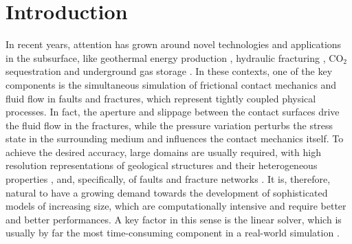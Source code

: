 \documentclass[3p,times]{elsarticle}
\theoremstyle{plain}
\begin{document}

\allowdisplaybreaks


\section{Introduction}
\label{sec:intro}

In recent years, attention has grown around novel technologies and applications in the
subsurface, like geothermal energy production \cite{pan2019establishment,
wei2019numerical, asai2019efficient}, hydraulic fracturing \cite{williams2019discursive,
tan2019politics, krzaczek2020simulations}, CO$_2$ sequestration \cite{fan2019thermo,
li2019coupled, liu2019tutorial} and underground gas storage \cite{zhou2019seismological,
karev2019geomechanical, firme2019salt}. In these contexts, one of the key components is
the simultaneous simulation of frictional contact mechanics and fluid flow in faults and fractures, which represent tightly coupled
physical processes. 
In fact, the aperture and slippage between the contact surfaces drive the fluid flow in the fractures, while the pressure variation perturbs the stress state in the surrounding medium and influences the contact mechanics itself. 
To achieve the
desired accuracy, large domains are usually required, with high resolution representations
of geological structures and their heterogeneous properties \cite{fergamjantea10,castelletto2013geological}, and, specifically, of faults and
fracture networks \cite{zoback2010reservoir, goodman1968model, ferronato2008numerical,
GarKarTch16,Set_etal17, shakiba2015using, ren2016fully, wong2019investigation,
wu2019integrating, deb2009extended, zhang2011extended, mohammadi2012xfem,
flemisch2016review, Berrone2017768, vahab2017numerical, khoei2018enriched, Berrone2019C317, Berrone2021B381}. It is, therefore, natural to have a growing demand towards the development of sophisticated models of increasing size, which are computationally intensive and require better and better performances. A key factor in this sense is the linear solver, which is usually by far the most
time-consuming component in a real-world simulation \cite{koric2016sparse,
franceschini2019robust}.
\end{document}
